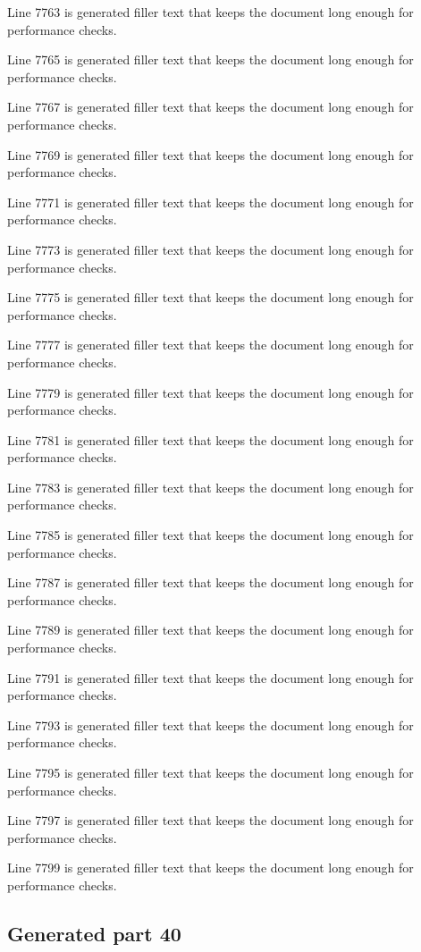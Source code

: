 Line 7763 is generated filler text that keeps the document long enough for performance checks.

Line 7765 is generated filler text that keeps the document long enough for performance checks.

Line 7767 is generated filler text that keeps the document long enough for performance checks.

Line 7769 is generated filler text that keeps the document long enough for performance checks.

Line 7771 is generated filler text that keeps the document long enough for performance checks.

Line 7773 is generated filler text that keeps the document long enough for performance checks.

Line 7775 is generated filler text that keeps the document long enough for performance checks.

Line 7777 is generated filler text that keeps the document long enough for performance checks.

Line 7779 is generated filler text that keeps the document long enough for performance checks.

Line 7781 is generated filler text that keeps the document long enough for performance checks.

Line 7783 is generated filler text that keeps the document long enough for performance checks.

Line 7785 is generated filler text that keeps the document long enough for performance checks.

Line 7787 is generated filler text that keeps the document long enough for performance checks.

Line 7789 is generated filler text that keeps the document long enough for performance checks.

Line 7791 is generated filler text that keeps the document long enough for performance checks.

Line 7793 is generated filler text that keeps the document long enough for performance checks.

Line 7795 is generated filler text that keeps the document long enough for performance checks.

Line 7797 is generated filler text that keeps the document long enough for performance checks.

Line 7799 is generated filler text that keeps the document long enough for performance checks.

\subsection{Generated part 40}

